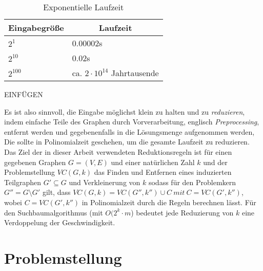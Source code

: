  \begin{table}[htb]
\caption{Exponentielle Laufzeit \label{tab:exponential}}
\vspace*{1em}
\centering

\bgroup
\def\arraystretch{1.3}%

\begin{threeparttable}

\begin{tabular}[c]{ l | l }
	
	\multicolumn{1}{c|}{\textbf{Eingabegröße}} & 
	\multicolumn{1}{c}{\textbf{Laufzeit}} \\ 
	
	\hline

	$2^{1}$& 0.00002s\\
	$2^{10}$& 0.02s\\
	$2^{100}$& ca. $ 2 \cdot 10^{14} $ Jahrtausende \\
	
\end{tabular}

\begin{tablenotes}\footnotesize
\item EINFÜGEN
\end{tablenotes}

\end{threeparttable}

\egroup

\end{table}
Es ist also sinnvoll, die Eingabe möglichst klein zu halten und zu \emph{reduzieren}, indem einfache Teile des Graphen durch Vorverarbeitung, englisch \emph{Preprocessing}, entfernt werden und gegebenenfalls in die Lösungsmenge aufgenommen werden, Die sollte in Polinomialzeit geschehen, um die gesamte Laufzeit zu reduzieren. Das Ziel der in dieser Arbeit verwendeten Reduktionsregeln ist für einen gegebenen Graphen $G=(V,E)$ und einer natürlichen Zahl $k$ und der Problemstellung $VC(G,k)$ das Finden und Entfernen eines induzierten Teilgraphen $G' \subseteq G$ und Verkleinerung von $k$
sodass für den Problemkern $G'' = G \setminus G'$ gilt, dass $VC(G,k) = VC(G'',k'') \cup C\ mit\ C=VC(G', k'')$, wobei $C=VC(G', k'')$ in Polinomialzeit durch die Regeln berechnen lässt. Für den Suchbaumalgorithmus (mit $O(2^{k} \cdot m$) bedeutet jede Reduzierung von $k$ eine Verdoppelung der Geschwindigkeit.



\section{Problemstellung}
\label{ch:Einleitung:sec:Problemstellung}

